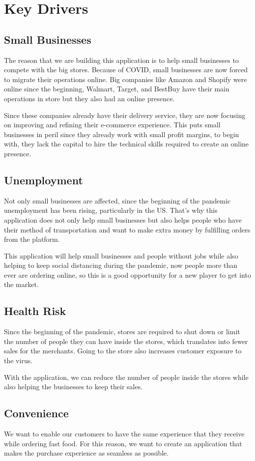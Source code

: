 \section{Key Drivers}
\subsection{Small Businesses}
The reason that we are building this application is to help small businesses to 
compete with the big stores. Because of COVID, small businesses are now forced 
to migrate their operations online. Big companies like Amazon and Shopify were 
online since the beginning, Walmart, Target, and BestBuy have their main 
operations in store but they also had an online presence. \newline

\noindent Since these companies already have their delivery 
service, they are now focusing on improving and refining their e-commerce 
experience. This puts small businesses in peril since they already work with 
small profit margins, to begin with, they lack the capital to hire the 
technical skills required to create an online presence. \newline

\subsection{Unemployment}
\noindent Not only small businesses are affected, since the beginning of the 
pandemic unemployment has been rising, particularly in the US. That’s why this 
application does not only help small businesses but also helps people who have 
their method of transportation and want to make extra money by fulfilling 
orders from the platform.\newline

\noindent This application will help small businesses and people without jobs 
while also helping to keep social distancing during the pandemic, now people 
more than ever are ordering online, so this is a good opportunity for a new 
player to get into the market.

\subsection{Health Risk}
\noindent Since the beginning of the pandemic, stores are required to shut 
down or limit the number of people they can have inside the stores, which 
translates into fewer sales for the merchants. Going to the store also 
increases customer exposure to the virus.\newline

\noindent With the application, we can reduce the number of people inside the 
stores while also helping the businesses to keep their sales.

\pagebreak

\subsection{Convenience}
\noindent We want to enable our customers to have the same experience that they 
receive while ordering fast food. For this reason, we want to create an 
application that makes the purchase experience as seamless as possible.